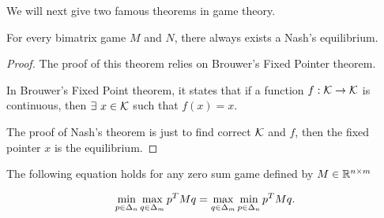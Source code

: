 \documentclass[../main.tex]{subfiles}
\begin{document}
	We will next give two famous theorems in game theory. 
	
	\begin{theorem}
		For every bimatrix game $M$ and $N$, there always exists a Nash's equilibrium.
	\end{theorem}

	\begin{proof}
		The proof of this theorem relies on Brouwer's Fixed Pointer theorem.
		
		In Brouwer's Fixed Point theorem, it states that if a function $f: \mathcal{K} \to \mathcal{K} $ is continuous, then $\exists\ x\in \mathcal{K}$ such that $f(x) = x$. 
		
		The proof of Nash's theorem is just to find correct $\mathcal{K}$ and $f$, then the fixed pointer $x$ is the equilibrium.
	\end{proof}

	\begin{theorem}	
		The following equation holds for any zero sum game defined by $M \in \mathbb{R}^{n \times m}$
		
		\begin{equation}
			\min\limits_{p \in \Delta_n} \max\limits_{q \in \Delta_m} p^T M q = \max\limits_{q \in \Delta_m} 	\min\limits_{p \in \Delta_n} p^T M q.
		\end{equation}		
	\end{theorem}
\end{document}
